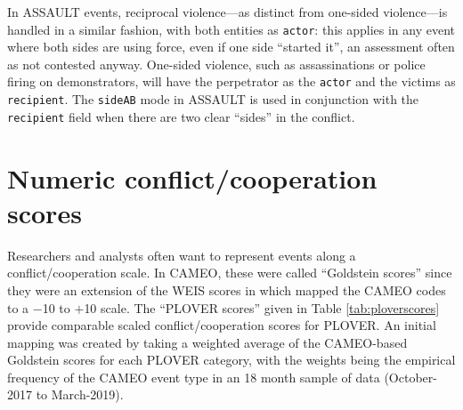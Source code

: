 \documentclass[11pt]{report}
\newcommand{\plcat}[1]{\textsf{#1}}
\newcommand{\plmod}[1]{\texttt{#1}}
\begin{document}
In \plcat{ASSAULT} events, reciprocal violence---as distinct from one-sided violence---is handled in a similar fashion, with both entities as \texttt{actor}: this applies in any event where both sides are using force, even if one side ``started it'', an assessment often as not contested anyway. One-sided violence, such as assassinations or police firing on demonstrators, will have the perpetrator as the \texttt{actor} and the victims as \texttt{recipient}. The \plmod{sideAB} mode in  \plcat{ASSAULT} is used in conjunction with the \texttt{recipient} field when there are two clear ``sides'' in the conflict.




\section{Numeric conflict/cooperation scores}


Researchers and analysts often want to represent events along a conflict/cooperation scale. In CAMEO, these were called ``Goldstein scores'' since they were an extension of the WEIS scores in \cite{Goldstein92} which mapped the CAMEO codes to a $-$10 to $+$10 scale. The ``PLOVER scores'' given in Table \ref{tab:ploverscores} provide comparable scaled conflict/cooperation scores for PLOVER. An initial mapping was created by taking a weighted average of the CAMEO-based Goldstein scores for each PLOVER category, with the weights being the empirical frequency of the CAMEO event type in an 18 month sample of data (October-2017 to March-2019). 
\end{document}
